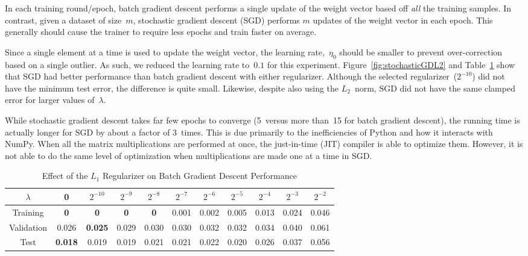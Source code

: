 \documentclass{report}
\begin{document}
  In each training round/epoch, batch gradient descent performs a single update of the weight vector based off \textit{all} the training samples.  In contrast, given a dataset of size~$m$, stochastic gradient descent (SGD) performs $m$ updates of the weight vector in each epoch.  This generally should cause the trainer to require less epochs and train faster on average.
  
  Since a single element at a time is used to update the weight vector, the learning rate,~$\eta_{0}$ should be smaller to prevent over-correction based on a single outlier.  As such, we reduced the learning rate to~$0.1$ for this experiment.  Figure~\ref{fig:stochasticGDL2} and Table~\ref{tab:stochasticGradientDescentL2} show that SGD had better performance than batch gradient descent with either regularizer.  Although the selected regularizer~($2^{-10}$) did not have the minimum test error, the difference is quite small.  Likewise, despite also using the $L_2$~norm, SGD did not have the same clamped error for larger values of~$\lambda$.
  
  While stochastic gradient descent takes far few epochs to converge (5~versus more than~15 for batch gradient descent), the running time is actually longer for SGD by about a factor of 3~times.  This is due primarily to the inefficiencies of Python and how it interacts with NumPy.  When all the matrix multiplications are performed at once, the just-in-time (JIT) compiler is able to optimize them.  However, it is not able to do the same level of optimization when multiplications are made one at a time in SGD.
  
  \begin{table}[]
    \centering
    \caption{Effect of the $L_1$ Regularizer on Batch Gradient Descent Performance}
    \label{tab:stochasticGradientDescentL2}
    \begin{tabular}{c||c|c|c|c|c|c|c|c|c|c}
      \hline
      $\lambda$  & 0              & $2^{-10}$ & $2^{-9}$ & $2^{-8}$       & $2^{-7}$ & $2^{-6}$ & $2^{-5}$ & $2^{-4}$ & $2^{-3}$ & $2^{-2}$ \\ \hline
      Training   & \textbf{0}  & \textbf{0}    & \textbf{0}    & \textbf{0} & 0.001   & 0.002    & 0.005    & 0.013    & 0.024    & 0.046    \\ \hline
      Validation & 0.026 & \textbf{0.025}    & 0.029  & 0.030 & 0.030    & 0.032    & 0.032    & 0.034    & 0.040    & 0.061    \\ \hline
      Test       & \textbf{0.018} & 0.019     & 0.019    & 0.021          & 0.021    & 0.022    & 0.020    & 0.026    & 0.037    & 0.056    \\ \hline
    \end{tabular}
  \end{table}
  
\end{document}
